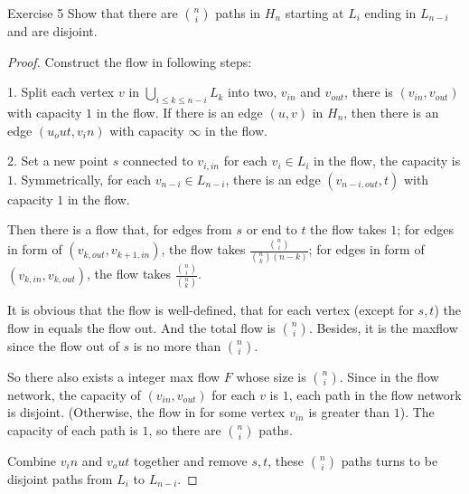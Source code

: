     \begin{thm}{Exercise 5}{}
        Show that there are $\binom{n}{i}$ paths in $H_n$ starting at $L_i$ ending in $L_{n-i}$ and are disjoint. 
    \end{thm}
    \begin{proof}
        Construct the flow in following steps: 

        1. Split each vertex $v$ in $\bigcup_{i\leq k\leq n-i}L_k$ into two, $v_{in}$ and $v_{out}$, there is $(v_{in},v_{out})$ with capacity $1$ in the flow. 
        If there is an edge $(u,v)$ in $H_n$, then there is an edge $(u_out, v_in)$ with capacity $\infty$ in the flow. 

        2. Set a new point $s$ connected to $v_{i,in}$ for each $v_i\in L_i$ in the flow, the capacity is $1$. 
        Symmetrically, for each $v_{n-i}\in L_{n-i}$, there is an edge $(v_{n-i,out},t)$ with capacity $1$ in the flow. 

        Then there is a flow that, for edges from $s$ or end to $t$ the flow takes $1$; for edges in form of 
        $(v_{k,out},v_{k+1,in})$, the flow takes $\frac{\binom{n}{i}}{\binom{n}{k}(n-k)}$; 
        for edges in form of $(v_{k,in},v_{k,out})$, the flow takes $\frac{\binom{n}{i}}{\binom{n}{k}}$. 

        It is obvious that the flow is well-defined, that for each vertex (except for $s,t$) the flow in equals the flow out. 
        And the total flow is $\binom{n}{i}$. Besides, it is the maxflow since the flow out of $s$ is no more than $\binom{n}{i}$. 

        So there also exists a integer max flow $F$ whose size is $\binom{n}{i}$. 
        Since in the flow network, the capacity of $(v_{in},v_{out})$ for each $v$ is $1$, each path in the flow network is disjoint. 
        (Otherwise, the flow in for some vertex $v_{in}$ is greater than $1$). 
        The capacity of each path is $1$, so there are $\binom{n}{i}$ paths. 

        Combine $v_in$ and $v_out$ together and remove $s,t$, these $\binom{n}{i}$ paths turns to be disjoint paths from $L_i$ to $L_{n-i}$.
    \end{proof} 

    \newpage

